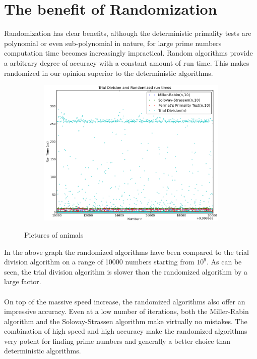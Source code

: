 \documentclass[compressed,final,notitlepage,narroweqnarray,inline,twoside,]{ieee}
\begin{document}
\section{The benefit of Randomization}
Randomization has clear benefits, although the deterministic primality tests are polynomial or even sub-polynomial in nature, for large prime numbers computation time becomes increasingly impractical. Random algorithms provide a arbitrary degree of accuracy with a constant amount of run time. This makes randomized in our opinion superior to the deterministic algorithms.
\begin{figure}[H]
        \centering
        \begin{subfigure}[b]{0.5\textwidth}
                \includegraphics[width=\textwidth]{../images/isPrime_Randomized_runtime}
                \label{fig:gull}
        \end{subfigure}
        \caption{Pictures of animals}\label{fig:animals}
\end{figure}
In the above graph the randomized algorithms have been compared to the trial division algorithm on a range of 10000 numbers starting from $10^9$. As can be seen, the trial division algorithm is slower than the randomized algorithm by a large factor.\\\\ On top of the massive speed increase, the randomized algorithms also offer an impressive accuracy. Even at a low number of iterations, both the Miller-Rabin algorithm and the Solovay-Strassen algorithm make virtually no mistakes. The combination of high speed and high accuracy make the randomized algorithms very potent for finding prime numbers and generally a better choice than deterministic algorithms.

 
\end{document}

